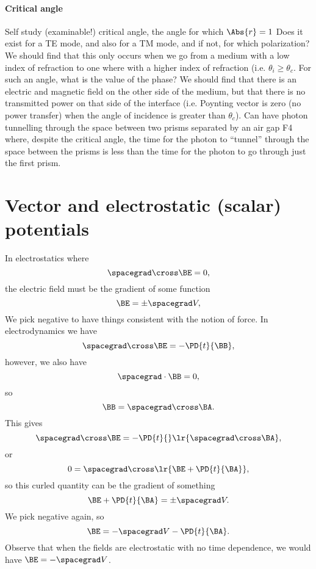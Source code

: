 \paragraph{Critical angle}
%
Self study (examinable!) critical angle, the angle for which \( \Abs{r} = 1 \)
%
Does it exist for a TE mode, and also for a TM mode, and if not, for which polarization?
%
We should find that this only occurs when we go from a medium with a low index of refraction to one where with a higher index of refraction (i.e. \( \theta_i \ge \theta_c \).
%
For such an angle, what is the value of the phase?
%
We should find that there is an electric and magnetic field on the other side of the medium, but that there is no transmitted power on that side of the interface (i.e. Poynting vector is zero (no power transfer) when the angle of incidence is greater than \( \theta_c \)).
%
Can have photon tunnelling through the space between two prisms separated by an air gap
%
F4
%
where, despite the critical angle, the time for the photon to ``tunnel'' through the space between the prisms is less than the time for the photon to go through just the first prism.
%
\section{Vector and electrostatic (scalar) potentials}
%
In electrostatics where
\begin{dmath}\label{eqn:emtLecture10:720}
\spacegrad \cross \BE  = 0,
\end{dmath}
%
the electric field must be the gradient of some function
\begin{dmath}\label{eqn:emtLecture10:740}
\BE = \pm \spacegrad V,
\end{dmath}
%
We pick negative to have things consistent with the notion of force.
%
In electrodynamics we have
\begin{dmath}\label{eqn:emtLecture10:760}
\spacegrad \cross \BE = - \PD{t}{\BB},
\end{dmath}
%
however, we also have
%
\begin{dmath}\label{eqn:emtLecture10:780}
\spacegrad \cdot \BB = 0,
\end{dmath}
%
so
\begin{dmath}\label{eqn:emtLecture10:800}
   \BB = \spacegrad \cross \BA.
\end{dmath}
%
This gives
\begin{dmath}\label{eqn:emtLecture10:820}
   \spacegrad \cross \BE = - \PD{t}{} \lr{ \spacegrad \cross \BA },
\end{dmath}
%
or
\begin{dmath}\label{eqn:emtLecture10:840}
0 =
\spacegrad \cross \lr{ \BE + \PD{t}{\BA} },
\end{dmath}
%
so this curled quantity can be the gradient of something
%
\begin{dmath}\label{eqn:emtLecture10:860}
\BE + \PD{t}{\BA} = \pm \spacegrad V.
\end{dmath}
%
We pick negative again, so
%
\begin{dmath}\label{eqn:emtLecture10:880}
\BE = -\spacegrad V -\PD{t}{\BA}.
\end{dmath}
%
Observe that when the fields are electrostatic with no time dependence, we would have \( \BE = -\spacegrad V \).
%
%
\EndNoBibArticle
